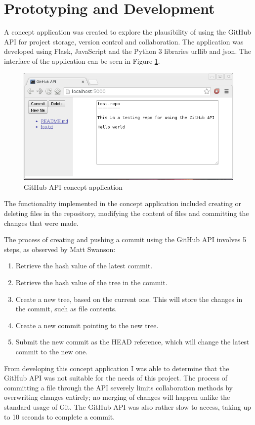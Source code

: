 \documentclass[a4paper, 12pt]{article}
\begin{document}
\section{Prototyping and Development}
A concept application was created to explore the plausibility of using the GitHub API for project storage, version control and collaboration. The application was developed using Flask, JavaScript and the Python 3 libraries urllib and json. The interface of the application can be seen in Figure \ref{fig:proto1}.

\begin{figure}[h]
	\centering
	\includegraphics[scale=0.6]{proto1}
	\caption{GitHub API concept application}
	\label{fig:proto1}
\end{figure}

The functionality implemented in the concept application included creating or deleting files in the repository, modifying the content of files and committing the changes that were made.

The process of creating and pushing a commit using the GitHub API involves 5 steps, as observed by Matt Swanson\cite{githubapicommit}:
\begin{enumerate}
	\item Retrieve the hash value of the latest commit.
	\item Retrieve the hash value of the tree in the commit.
	\item Create a new tree, based on the current one. This will store the changes in the commit, such as file contents.
	\item Create a new commit pointing to the new tree.
	\item Submit the new commit as the HEAD reference, which will change the latest commit to the new one.
\end{enumerate}

From developing this concept application I was able to determine that the GitHub API was not suitable for the needs of this project. The process of committing a file through the API severely limits collaboration methods by overwriting changes entirely; no merging of changes will happen unlike the standard usage of Git. The GitHub API was also rather slow to access, taking up to 10 seconds to complete a commit.
\end{document}
